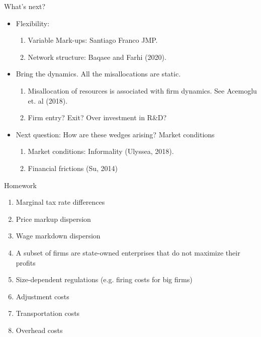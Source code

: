 \documentclass[usenames,dvipsnames,aspectratio=169]{beamer}
\begin{document}
\begin{frame}{What's next?}
    \begin{itemize}[label=\textcolor{teal}{$\blacktriangleright$}]
        \item Flexibility:
        \begin{enumerate}[label=\textbf{\textcolor{teal}{\arabic*.}}]
            \item Variable Mark-ups: Santiago Franco JMP. 
            \item Network structure: Baqaee and Farhi (2020).
        \end{enumerate}
        \vfill
        \item Bring the dynamics. All the misallocations are static. 
        \begin{enumerate}[label=\textbf{\textcolor{teal}{\arabic*.}}]
            \item Misallocation of resources is associated with firm dynamics. See Acemoglu et. al (2018). 
            \item Firm entry? Exit? Over investment in R\&D? 
        \end{enumerate}
        \vfill
        \item Next question: How are these wedges arising? Market conditions
        \begin{enumerate}[label=\textbf{\textcolor{teal}{\arabic*.}}]
            \item Market conditions: Informality (Ulyssea, 2018). 
            \item Financial frictions (Su, 2014)
        \end{enumerate}
    \end{itemize}
\end{frame}

\begin{frame}[allowframebreaks]{Homework}
\begin{enumerate}[label=\textbf{\textcolor{teal}{(\alph*)}},leftmargin=*]
    \item Marginal tax rate differences 
    \item Price markup dispersion 
    \item Wage markdown dispersion 
    \item A subset of firms are state-owned enterprises that do not maximize their profits 
    \item Size-dependent regulations (e.g. firing costs for big firms) 
    \item Adjustment costs 
    \item Transportation costs 
    \item Overhead costs 
\end{enumerate}

\end{frame}
\end{document}

